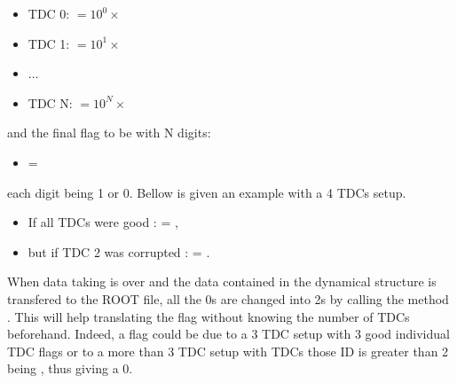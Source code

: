 	\begin{itemize}
		\item[] TDC 0:  $= 10^0 \times$ 
		\item[] TDC 1:  $= 10^1 \times$ 
		\item[] ...
		\item[] TDC N:  $= 10^N \times$ 
	\end{itemize}
                         
and the final flag to be with N digits:
	
	\begin{itemize}
		\item[]  = 
	\end{itemize}
	
each digit being 1 or 0. Bellow is given an example with a 4 TDCs setup.
	
	\begin{itemize}
		\item[] If all TDCs were good :  = ,
		\item[] but if TDC 2 was corrupted :  = .
	\end{itemize}
                        
	When data taking is over and the data contained in the dynamical  structure is transfered to the ROOT file, all the 0s are changed into 2s by calling the method . This will help translating the flag without knowing the number of TDCs beforehand. Indeed, a flag  could be due to a 3 TDC setup with 3 good individual TDC flags or to a more than 3 TDC setup with TDCs those ID is greater than 2 being , thus giving a 0.
	

